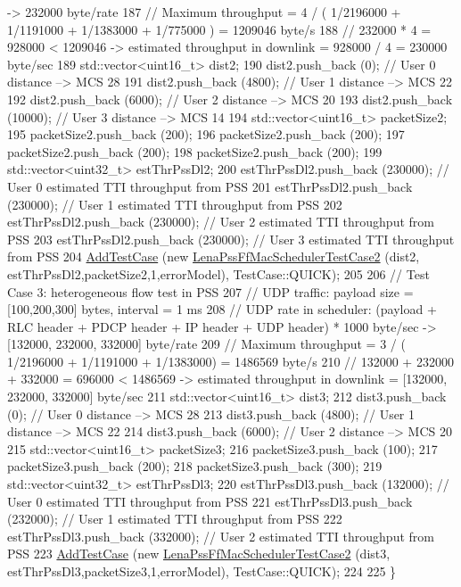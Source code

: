 \begin{DoxyCode}
{       -> 232000 byte/rate }
187   \textcolor{comment}{// Maximum throughput = 4 / ( 1/2196000 + 1/1191000 + 1/1383000 + 1/775000 ) = 1209046 byte/s}
188   \textcolor{comment}{// 232000 * 4 = 928000 < 1209046 -> estimated throughput in downlink = 928000 / 4 = 230000 byte/sec}
189   std::vector<uint16\_t> dist2;
190   dist2.push\_back (0);       \textcolor{comment}{// User 0 distance --> MCS 28}
191   dist2.push\_back (4800);    \textcolor{comment}{// User 1 distance --> MCS 22}
192   dist2.push\_back (6000);    \textcolor{comment}{// User 2 distance --> MCS 20}
193   dist2.push\_back (10000);   \textcolor{comment}{// User 3 distance --> MCS 14}
194   std::vector<uint16\_t> packetSize2;
195   packetSize2.push\_back (200);
196   packetSize2.push\_back (200);
197   packetSize2.push\_back (200);
198   packetSize2.push\_back (200);
199   std::vector<uint32\_t> estThrPssDl2;
200   estThrPssDl2.push\_back (230000); \textcolor{comment}{// User 0 estimated TTI throughput from PSS}
201   estThrPssDl2.push\_back (230000); \textcolor{comment}{// User 1 estimated TTI throughput from PSS}
202   estThrPssDl2.push\_back (230000); \textcolor{comment}{// User 2 estimated TTI throughput from PSS}
203   estThrPssDl2.push\_back (230000); \textcolor{comment}{// User 3 estimated TTI throughput from PSS}
204   \hyperlink{classns3_1_1TestCase_a3718088e3eefd5d6454569d2e0ddd835}{AddTestCase} (\textcolor{keyword}{new} \hyperlink{classLenaPssFfMacSchedulerTestCase2}{LenaPssFfMacSchedulerTestCase2} (dist2,
      estThrPssDl2,packetSize2,1,errorModel), TestCase::QUICK);
205 
206   \textcolor{comment}{// Test Case 3: heterogeneous flow test in PSS}
207   \textcolor{comment}{//   UDP traffic: payload size = [100,200,300] bytes, interval = 1 ms}
208   \textcolor{comment}{//   UDP rate in scheduler: (payload + RLC header + PDCP header + IP header + UDP header) * 1000 byte/sec
       -> [132000, 232000, 332000] byte/rate}
209   \textcolor{comment}{// Maximum throughput = 3 / ( 1/2196000 + 1/1191000 + 1/1383000) = 1486569 byte/s}
210   \textcolor{comment}{// 132000 + 232000 + 332000 = 696000 < 1486569 -> estimated throughput in downlink = [132000, 232000,
       332000] byte/sec}
211   std::vector<uint16\_t> dist3;
212   dist3.push\_back (0);    \textcolor{comment}{// User 0 distance --> MCS 28}
213   dist3.push\_back (4800);    \textcolor{comment}{// User 1 distance --> MCS 22}
214   dist3.push\_back (6000);    \textcolor{comment}{// User 2 distance --> MCS 20}
215   std::vector<uint16\_t> packetSize3;
216   packetSize3.push\_back (100);
217   packetSize3.push\_back (200);
218   packetSize3.push\_back (300);
219   std::vector<uint32\_t> estThrPssDl3;
220   estThrPssDl3.push\_back (132000); \textcolor{comment}{// User 0 estimated TTI throughput from PSS}
221   estThrPssDl3.push\_back (232000); \textcolor{comment}{// User 1 estimated TTI throughput from PSS}
222   estThrPssDl3.push\_back (332000); \textcolor{comment}{// User 2 estimated TTI throughput from PSS}
223   \hyperlink{classns3_1_1TestCase_a3718088e3eefd5d6454569d2e0ddd835}{AddTestCase} (\textcolor{keyword}{new} \hyperlink{classLenaPssFfMacSchedulerTestCase2}{LenaPssFfMacSchedulerTestCase2} (dist3,
      estThrPssDl3,packetSize3,1,errorModel), TestCase::QUICK);
224 
225 \}
\end{DoxyCode}


